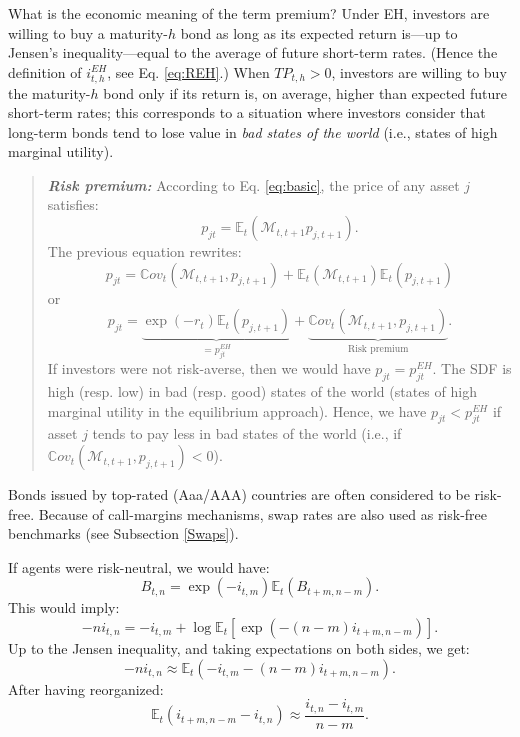 \documentclass[
  12pt,
]{book}
\theoremstyle{definition}
\theoremstyle{definition}
\theoremstyle{definition}
\theoremstyle{definition}
\theoremstyle{remark}
\begin{document}
What is the economic meaning of the term premium? Under EH, investors are willing to buy a maturity-\(h\) bond as long as its expected return is---up to Jensen's inequality---equal to the average of future short-term rates. (Hence the definition of \(i^{EH}_{t,h}\), see Eq. \eqref{eq:REH}.) When \(TP_{t,h}>0\), investors are willing to buy the maturity-\(h\) bond only if its return is, on average, higher than expected future short-term rates; this corresponds to a situation where investors consider that long-term bonds tend to lose value in \emph{bad states of the world} (i.e., states of high marginal utility).

\begin{quote}
\textbf{\emph{Risk premium:}} According to Eq. \eqref{eq:basic}, the price of any asset \(j\) satisfies:
\[
p_{jt} = \mathbb{E}_t(\mathcal{M}_{t,t+1} p_{j,t+1}).
\]
The previous equation rewrites:
\[
p_{jt} =  \mathbb{C}ov_t(\mathcal{M}_{t,t+1}, p_{j,t+1}) + \mathbb{E}_t(\mathcal{M}_{t,t+1})\mathbb{E}_t( p_{j,t+1})
\]
or
\begin{equation}
p_{jt} = \underbrace{\exp(-r_t)\mathbb{E}_t( p_{j,t+1})}_{=p^{EH}_{jt}} + \underbrace{\mathbb{C}ov_t(\mathcal{M}_{t,t+1}, p_{j,t+1})}_{\mbox{Risk premium}}.\label{eq:CovRP}
\end{equation}
If investors were not risk-averse, then we would have \(p_{jt} = p^{EH}_{jt}\). The SDF is high (resp. low) in bad (resp. good) states of the world (states of high marginal utility in the equilibrium approach). Hence, we have \(p_{jt}< p^{EH}_{jt}\) if asset \(j\) tends to pay less in bad states of the world (i.e., if \(\mathbb{C}ov_t(\mathcal{M}_{t,t+1}, p_{j,t+1})<0\)).
\end{quote}

Bonds issued by top-rated (Aaa/AAA) countries are often considered to be risk-free. Because of call-margins mechanisms, swap rates are also used as risk-free benchmarks \citep{Duffie_Stein_2015} (see Subsection \ref{Swaps}).

If agents were risk-neutral, we would have:
\[
B_{t,n} = \exp(-i_{t,m})\mathbb{E}_t(B_{t+m,n-m}).
\]
This would imply:
\[
-n i_{t,n} = -i_{t,m} + \log \mathbb{E}_t[\exp(-(n-m) i_{t+m,n-m})].
\]
Up to the Jensen inequality, and taking expectations on both sides, we get:
\[
-n i_{t,n} \approx \mathbb{E}_t(-i_{t,m} -(n-m) i_{t+m,n-m}).
\]
After having reorganized:
\begin{equation}
\mathbb{E}_t(i_{t+m,n-m}-i_{t,n}) \approx \frac{i_{t,n}-i_{t,m}}{n-m}.\label{eq:CStheo}
\end{equation}
\end{document}
